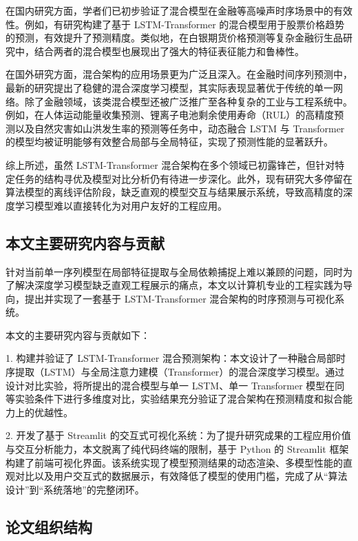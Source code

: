 \documentclass[UTF8,AutoFakeBold=1,AutoFakeSlant,zihao=-4]{SCAU}
\begin{document}
在国内研究方面，学者们已初步验证了混合模型在金融等高噪声时序场景中的有效性。例如，有研究构建了基于 LSTM-Transformer 的混合模型用于股票价格趋势的预测，有效提升了预测精度\citep{1022075900.nh}。类似地，在白银期货价格预测等复杂金融衍生品研究中，结合两者的混合模型也展现出了强大的特征表征能力和鲁棒性\citep{1025341961.nh}。

在国外研究方面，混合架构的应用场景更为广泛且深入。在金融时间序列预测中，最新的研究提出了稳健的混合深度学习模型，其实际表现显著优于传统的单一网络\citep{kabir2025lstm}。除了金融领域，该类混合模型还被广泛推广至各种复杂的工业与工程系统中。例如，在人体运动能量收集预测\citep{gong2025dynamic}、锂离子电池剩余使用寿命（RUL）的高精度预测\citep{zhao2025correction}以及自然灾害如山洪发生率的预测\citep{zhang2026time}等任务中，动态融合 LSTM 与 Transformer 的模型均被证明能够有效整合局部与全局特征，实现了预测性能的显著跃升。

综上所述，虽然 LSTM-Transformer 混合架构在多个领域已初露锋芒，但针对特定任务的结构寻优及模型对比分析仍有待进一步深化。此外，现有研究大多停留在算法模型的离线评估阶段，缺乏直观的模型交互与结果展示系统，导致高精度的深度学习模型难以直接转化为对用户友好的工程应用。

\subsection{本文主要研究内容与贡献}
针对当前单一序列模型在局部特征提取与全局依赖捕捉上难以兼顾的问题，同时为了解决深度学习模型缺乏直观工程展示的痛点，本文以计算机专业的工程实践为导向，提出并实现了一套基于 LSTM-Transformer 混合架构的时序预测与可视化系统。

本文的主要研究内容与贡献如下：

1. 构建并验证了 LSTM-Transformer 混合预测架构：本文设计了一种融合局部时序提取（LSTM）与全局注意力建模（Transformer）的混合深度学习模型。通过设计对比实验，将所提出的混合模型与单一 LSTM、单一 Transformer 模型在同等实验条件下进行多维度对比，实验结果充分验证了混合架构在预测精度和拟合能力上的优越性。

2. 开发了基于 Streamlit 的交互式可视化系统：为了提升研究成果的工程应用价值与交互分析能力，本文脱离了纯代码终端的限制，基于 Python 的 Streamlit 框架构建了前端可视化界面。该系统实现了模型预测结果的动态渲染、多模型性能的直观对比以及用户交互式的数据展示，有效降低了模型的使用门槛，完成了从“算法设计”到“系统落地”的完整闭环。

\subsection{论文组织结构}
\end{document}
